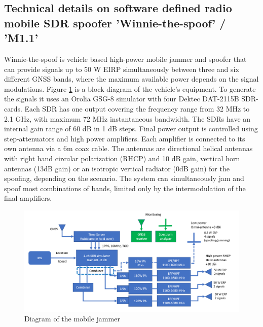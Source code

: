 \subsection{Technical details on software defined radio mobile SDR spoofer 'Winnie-the-spoof' / 'M1.1'}
Winnie-the-spoof is vehicle based high-power mobile jammer and spoofer that can provide signals up to 50 W EIRP simultaneously between three and six different GNSS bands,
 where the maximum available power depends on the signal modulations. Figure \ref{fig: M1.1-1 Winnie-the-spoof} is a block diagram of the vehicle's equipment. 
 To generate the signals it uses an Orolia GSG-8 simulator with four Dektec DAT-2115B SDR-cards. 
 Each SDR has one output covering the frequency range from 32 MHz to 2.1 GHz, with maximum 72 MHz instantaneous bandwidth. 
 The SDRs have an internal gain range of 60 dB in 1 dB steps. Final power output is controlled using step-attenuators and high power amplifiers. 
 Each amplifier is connected to its own antenna via a 6m coax cable. 
 The antennas are directional helical antennas with right hand circular polarization (RHCP) and 10 dB gain, 
 vertical horn antennas (13dB gain) or an isotropic vertical radiator (0dB gain) for the spoofing, depending on the scenario. 
 The system can simultaneously jam and spoof most combinations of bands, limited only by the intermodulation of the final amplifiers.

\begin{figure}[H]
    \includegraphics[width=\textwidth]{graphics/appendixG/2025.04.29_M1.1_Winnie-the-spoof.png}
    \caption{Diagram of the mobile jammer}
    \label{fig: M1.1-1 Winnie-the-spoof}
\end{figure}

